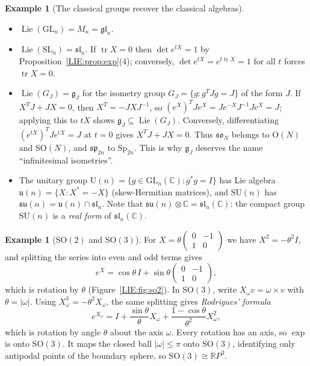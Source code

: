 \documentclass[11pt,openany]{book}
\theoremstyle{plain}
\theoremstyle{definition}
\newtheorem{example}[theorem]{Example}
\theoremstyle{remark}
\newcommand{\R}{\mathbb{R}}
\newcommand{\C}{\mathbb{C}}
\newcommand{\GL}{\mathrm{GL}}
\newcommand{\SL}{\mathrm{SL}}
\newcommand{\SO}{\mathrm{SO}}
\newcommand{\Orth}{\mathrm{O}}
\newcommand{\abs}[1]{\left\lvert #1 \right\rvert}
\begin{document}
\begin{example}[The classical groups recover the classical algebras]\leavevmode
\begin{itemize}[nosep]
\item $\operatorname{Lie}(\GL_n)=M_n=\mathfrak{gl}_n$.
\item $\operatorname{Lie}(\SL_n)=\mathfrak{sl}_n$. If $\operatorname{tr}X=0$ then $\det e^{tX}=1$ by
  Proposition~\ref{LIE:prop:exp}(4); conversely, $\det e^{tX}=e^{t\operatorname{tr}X}=1$ for all $t$ forces
  $\operatorname{tr}X=0$.
\item $\operatorname{Lie}(G_J)=\mathfrak g_J$ for the isometry group $G_J=\{g: g^TJg=J\}$ of the form $J$. If
  $X^TJ+JX=0$, then $X^T=-JXJ^{-1}$, so $(e^{X})^TJe^{X}=Je^{-X}J^{-1}Je^{X}=J$; applying this to $tX$ shows $\mathfrak g_J\subseteq
  \operatorname{Lie}(G_J)$. Conversely, differentiating $(e^{tX})^TJe^{tX}=J$ at $t=0$ gives $X^TJ+JX=0$. Thus $\mathfrak{so}_N$
  belongs to $\Orth(N)$ and $\SO(N)$, and $\mathfrak{sp}_{2n}$ to $\mathrm{Sp}_{2n}$. This is why $\mathfrak g_J$
  deserves the name ``infinitesimal isometries''.
\item The unitary group $\mathrm U(n)=\{g\in\GL_n(\C): g^*g=I\}$ has Lie algebra
  $\mathfrak u(n)=\{X: X^*=-X\}$ (skew-Hermitian matrices), and $\mathrm{SU}(n)$ has
  $\mathfrak{su}(n)=\mathfrak u(n)\cap\mathfrak{sl}_n$. Note that $\mathfrak{su}(n)\otimes\C=\mathfrak{sl}_n(\C)$: the
  compact group $\mathrm{SU}(n)$ is a \emph{real form} of $\mathfrak{sl}_n(\C)$.
\end{itemize}
\end{example}

\begin{example}[$\SO(2)$ and $\SO(3)$]\label{LIE:ex:so3}
For $X=\theta\left(\begin{smallmatrix}0&-1\\1&0\end{smallmatrix}\right)$ we have $X^2=-\theta^2I$, and
splitting the series into even and odd terms gives
\[
  e^X=\cos\theta\,I+\sin\theta\begin{pmatrix}0&-1\\1&0\end{pmatrix},
\]
which is rotation by $\theta$ (Figure~\ref{LIE:fig:so2}). In $\SO(3)$, write $X_\omega v=\omega\times v$
with $\theta=\abs{\omega}$. Using $X_\omega^3=-\theta^2X_\omega$, the same splitting gives
\emph{Rodrigues' formula}
\[
  e^{X_\omega}=I+\frac{\sin\theta}{\theta}X_\omega+\frac{1-\cos\theta}{\theta^2}X_\omega^2,
\]
which is rotation by angle $\theta$ about the axis $\omega$. Every rotation has an axis, so $\exp$ is
onto $\SO(3)$. It maps the closed ball $\abs{\omega}\le\pi$ onto $\SO(3)$, identifying only antipodal
points of the boundary sphere, so $\SO(3)\cong\R P^3$.
\end{example}
\end{document}

